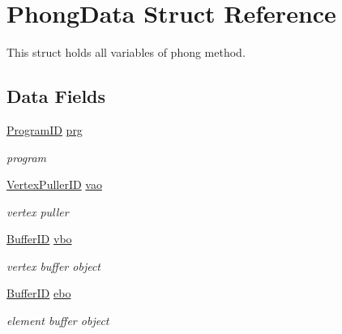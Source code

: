 \hypertarget{structPhongData}{}\section{Phong\+Data Struct Reference}
\label{structPhongData}


This struct holds all variables of phong method.  


\subsection*{Data Fields}
\begin{DoxyCompactItemize}
\item 
\hyperlink{student_2fwd_8h_a15e62786033208aec9487a51e808f81d}{Program\+ID} \hyperlink{structPhongData_abe8d787c8d298a58614c7d98dbf43a91}{prg}
\begin{DoxyCompactList}\small\item\em program \end{DoxyCompactList}\item 
\mbox{\label{structPhongData_ab4fea966d31bc380ac251333b886dc78}} 
\hyperlink{student_2fwd_8h_a23828e2281a794e193ebaf0df3e1f17c}{Vertex\+Puller\+ID} \hyperlink{structPhongData_ab4fea966d31bc380ac251333b886dc78}{vao}
\begin{DoxyCompactList}\small\item\em vertex puller \end{DoxyCompactList}\item 
\mbox{\label{structPhongData_a53b7db465026f1e4416e7265ea875e47}} 
\hyperlink{student_2fwd_8h_a60a12bf4868ebe47cc571ce96a03f99c}{Buffer\+ID} \hyperlink{structPhongData_a53b7db465026f1e4416e7265ea875e47}{vbo}
\begin{DoxyCompactList}\small\item\em vertex buffer object \end{DoxyCompactList}\item 
\mbox{\label{structPhongData_a0b6482c1de95c6850fe9c7b6834760c8}} 
\hyperlink{student_2fwd_8h_a60a12bf4868ebe47cc571ce96a03f99c}{Buffer\+ID} \hyperlink{structPhongData_a0b6482c1de95c6850fe9c7b6834760c8}{ebo}
\begin{DoxyCompactList}\small\item\em element buffer object \end{DoxyCompactList}\end{DoxyCompactItemize}


